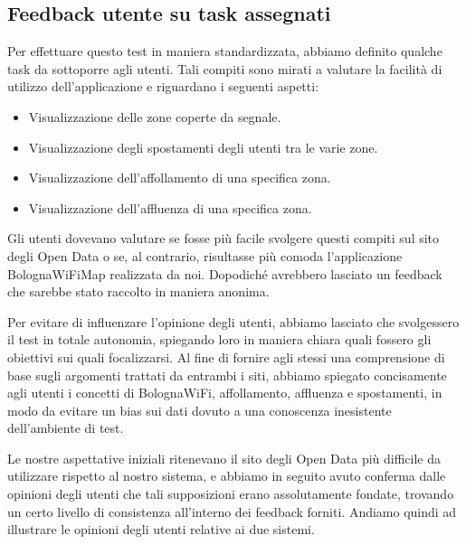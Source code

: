 \subsection{Feedback utente su task assegnati}
Per effettuare questo test in maniera standardizzata, abbiamo definito qualche task da sottoporre agli utenti. Tali compiti sono mirati a valutare la facilità di utilizzo dell'applicazione e riguardano i seguenti aspetti:
\begin{itemize}
    \item Visualizzazione delle zone coperte da segnale.
    \item Visualizzazione degli spostamenti degli utenti tra le varie zone.
    \item Visualizzazione dell'affollamento di una specifica zona.
    \item Visualizzazione dell'affluenza di una specifica zona.
\end{itemize}

Gli utenti dovevano valutare se fosse più facile svolgere questi compiti sul sito degli Open Data o se, al contrario, risultasse più comoda l'applicazione BolognaWiFiMap realizzata da noi. Dopodiché avrebbero lasciato un feedback che sarebbe stato raccolto in maniera anonima.

Per evitare di influenzare l'opinione degli utenti, abbiamo lasciato che svolgessero il test in totale autonomia, spiegando loro in maniera chiara quali fossero gli obiettivi sui quali focalizzarsi. Al fine di fornire agli stessi una comprensione di base sugli argomenti trattati da entrambi i siti, abbiamo spiegato concisamente agli utenti i concetti di BolognaWiFi, affollamento, affluenza e spostamenti, in modo da evitare un bias sui dati dovuto a una conoscenza inesistente dell'ambiente di test.

Le nostre aspettative iniziali ritenevano il sito degli Open Data più difficile da utilizzare rispetto al nostro sistema, e abbiamo in seguito avuto conferma dalle opinioni degli utenti che tali supposizioni erano assolutamente fondate, trovando un certo livello di consistenza all'interno dei feedback forniti. Andiamo quindi ad illustrare le opinioni degli utenti relative ai due sistemi.

